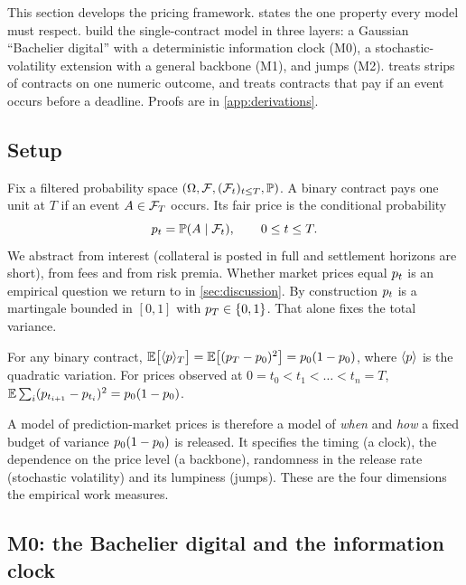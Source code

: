 This section develops the pricing framework.  states the one property every
model must respect.  build the single-contract model
in three layers: a Gaussian ``Bachelier digital'' with a deterministic information clock (M0), a
stochastic-volatility extension with a general backbone (M1), and jumps (M2).
 treats strips of contracts on one numeric outcome, and
 treats contracts that pay if an event occurs before a deadline. Proofs are
in \cref{app:derivations}.

\subsection{Setup}\label{sec:model-setup}

Fix a filtered probability space $(\Omega,\mathcal{F},(\mathcal{F}_t)_{t\le T},\mathbb{P})$. A binary contract pays one
unit at $T$ if an event $A\in\mathcal{F}_T$ occurs. Its fair price is the conditional probability
\begin{equation}\label{eq:fair}
  p_t=\mathbb{P}(A\mid\mathcal{F}_t),\qquad 0\le t\le T .
\end{equation}
We abstract from interest (collateral is posted in full and settlement horizons are short), from
fees and from risk premia. Whether market prices equal $p_t$ is an empirical question we return
to in \cref{sec:discussion}. By construction $p_t$ is a martingale bounded in $[0,1]$ with
$p_T\in\{0,1\}$. That alone fixes the total variance.

\begin{lemma}\label{lem:variance}
For any binary contract, $\mathbb{E}\big[\langle p\rangle_T\big]=\mathbb{E}\big[(p_T-p_0)^2\big]=p_0(1-p_0)$,
where $\langle p\rangle$ is the quadratic variation. For prices observed at
$0=t_0<t_1<\dots<t_n=T$, $\mathbb{E}\sum_i(p_{t_{i+1}}-p_{t_i})^2=p_0(1-p_0)$.
\end{lemma}

A model of prediction-market prices is therefore a model of \emph{when} and \emph{how} a fixed
budget of variance $p_0(1-p_0)$ is released. It specifies the timing (a clock), the dependence
on the price level (a backbone), randomness in the release rate (stochastic volatility) and its
lumpiness (jumps). These are the four dimensions the empirical work measures.

\subsection{M0: the Bachelier digital and the information clock}\label{sec:model-m0}

